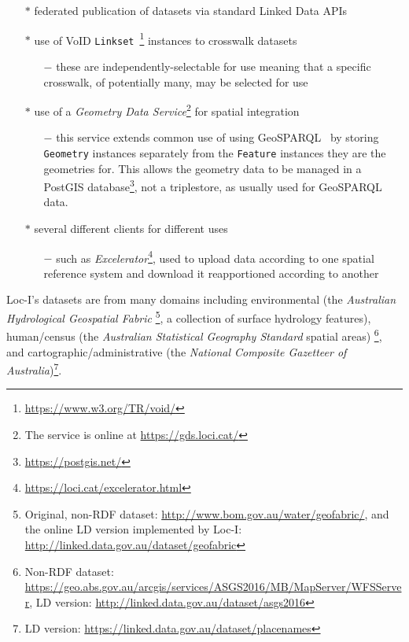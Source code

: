 \documentclass[runningheads]{llncs}
\begin{document}
\begin{itemize}
    \item[$\ast$] federated publication of datasets via standard Linked Data APIs
    \item[$\ast$] use of VoID \texttt{Linkset}~\footnote{\url{https://www.w3.org/TR/void/}} instances to crosswalk datasets
    \begin{itemize}
        \item[$-$] these are independently-selectable for use meaning that a specific crosswalk, of potentially many, may be selected for use
    \end{itemize} 
    \item[$\ast$] use of a \textit{Geometry Data Service}\footnote{The service is online at \url{https://gds.loci.cat/}} for spatial integration
    \begin{itemize}
        \item[$-$] this service extends common use of using GeoSPARQL~\cite{open2012ogc} by storing \texttt{Geometry} instances separately from the \texttt{Feature} instances they are the geometries for. This allows the geometry data to be managed in a PostGIS database\footnote{\url{https://postgis.net/}}, not a triplestore, as usually used for GeoSPARQL data.
    \end{itemize}
    \item[$\ast$] several different clients for different uses
    \begin{itemize}
        \item[$-$] such as \textit{Excelerator}\footnote{\url{https://loci.cat/excelerator.html}}, used to upload data according to one spatial reference system and download it reapportioned according to another
    \end{itemize}
\end{itemize} 

Loc-I's datasets are from many domains including environmental (the \textit{Australian Hydrological Geospatial Fabric}
\footnote{Original, non-RDF dataset: \url{http://www.bom.gov.au/water/geofabric/}, and the online LD version implemented by Loc-I: \url{http://linked.data.gov.au/dataset/geofabric}}, 
a collection of surface hydrology features), human/census (the \textit{Australian Statistical Geography Standard} spatial areas)
\footnote{Non-RDF dataset: \url{https://geo.abs.gov.au/arcgis/services/ASGS2016/MB/MapServer/WFSServer}, LD version: \url{http://linked.data.gov.au/dataset/asgs2016}}, 
and cartographic/administrative (the \textit{National Composite Gazetteer of Australia})\footnote{LD version: \url{https://linked.data.gov.au/dataset/placenames}}. 
\end{document}

